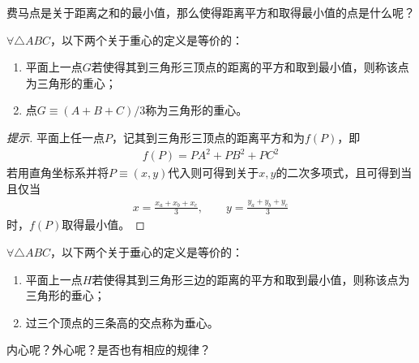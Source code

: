 费马点是关于距离之和的最小值，那么使得距离平方和取得最小值的点是什么呢？

\begin{theorem}[重心]
  $\forall\triangle ABC$，以下两个关于重心的定义是等价的：
  \begin{enumerate}
  \item 平面上一点$G$若使得其到三角形三顶点的距离的平方和取到最小值，则称该点为三角形的重心；    
  \item 点$G\equiv (A+B+C)/3$称为三角形的重心。
  \end{enumerate}
\end{theorem}
\begin{proof}[提示]
  平面上任一点$P$，记其到三角形三顶点的距离平方和为$f(P)$，即
  \begin{align*}
    f(P)=PA^2 + PB^2 + PC^2
  \end{align*}
  若用直角坐标系并将$P\equiv(x,y)$代入则可得到关于$x,y$的二次多项式，且可得到当且仅当
  \begin{align*}
    x=\frac{x_a + x_b + x_c}{3},\qquad
    y=\frac{y_a + y_b + y_c}{3}
  \end{align*}
  时，$f(P)$取得最小值。
\end{proof}

\begin{theorem}[垂心]
  $\forall\triangle ABC$，以下两个关于垂心的定义是等价的：
  \begin{enumerate}
  \item 平面上一点$H$若使得其到三角形三边的距离的平方和取到最小值，则称该点为三角形的垂心；    
  \item 过三个顶点的三条高的交点称为垂心。
  \end{enumerate}
\end{theorem}

{\color{red}内心呢？外心呢？是否也有相应的规律？}

